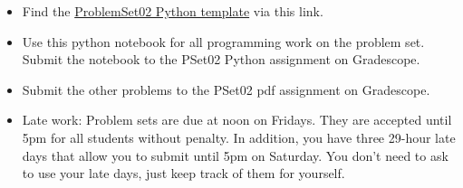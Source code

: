 \documentclass[12pt,letterpaper,noanswers]{exam}
\begin{document}
 \pdfpageheight 11in 
  \pdfpagewidth 8.5in
  

\begin{itemize}
    \itemsep0pt
    \item Find the \href{https://github.com/sarah1123/ScientificComputing-APMTH111/tree/main/2023Fall/PythonFiles/02_linearleastsquares}{ProblemSet02 Python template} via this link.
    \item Use this python notebook for all programming work on the problem set.  Submit the notebook to the PSet02 Python assignment on Gradescope.
    \item Submit the other problems to the PSet02 pdf assignment on Gradescope.
    \item Late work: Problem sets are due at noon on Fridays.  They are accepted until 5pm for all students without penalty.  In addition, you have three 29-hour late days that allow you to submit until 5pm on Saturday.  You don't need to ask to use your late days, just keep track of them for yourself.
\end{itemize}
 
\end{document}
